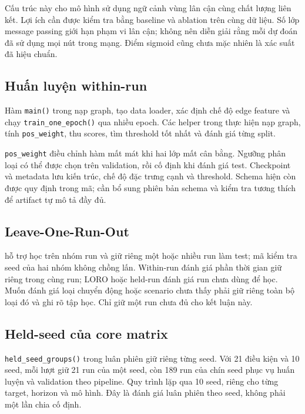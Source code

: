 \documentclass[12pt,a4paper]{article}
\newcommand{\code}[1]{{\small\texttt{#1}}}
\begin{document}
Cấu trúc này cho mô hình sử dụng ngữ cảnh vùng lân cận cùng chất lượng liên kết. Lợi ích cần được kiểm tra bằng baseline và ablation trên cùng dữ liệu. Số lớp message passing giới hạn phạm vi lân cận; không nên diễn giải rằng mỗi dự đoán đã sử dụng mọi nút trong mạng. Điểm sigmoid cũng chưa mặc nhiên là xác suất đã hiệu chuẩn.

\subsection{Huấn luyện within-run}

Hàm \code{main()} trong  nạp graph, tạo data loader, xác định chế độ edge feature và chạy \code{train\_one\_epoch()} qua nhiều epoch. Các helper trong  thực hiện nạp graph, tính \code{pos\_weight}, thu scores, tìm threshold tốt nhất và đánh giá từng split.

\code{pos\_weight} điều chỉnh hàm mất mát khi hai lớp mất cân bằng. Ngưỡng phân loại có thể được chọn trên validation, rồi cố định khi đánh giá test. Checkpoint và metadata lưu kiến trúc, chế độ đặc trưng cạnh và threshold. Schema hiện còn được quy định trong mã; cần bổ sung phiên bản schema và kiểm tra tương thích để artifact tự mô tả đầy đủ.

\subsection{Leave-One-Run-Out}

 hỗ trợ học trên nhóm run và giữ riêng một hoặc nhiều run làm test; mã kiểm tra seed của hai nhóm không chồng lấn. Within-run đánh giá phần thời gian giữ riêng trong cùng run; LORO hoặc held-run đánh giá run chưa dùng để học. Muốn đánh giá loại chuyển động hoặc scenario chưa thấy phải giữ riêng toàn bộ loại đó và ghi rõ tập học. Chỉ giữ một run chưa đủ cho kết luận này.

\subsection{Held-seed của core matrix}

\code{held\_seed\_groups()} trong  luân phiên giữ riêng từng seed. Với 21 điều kiện và 10 seed, mỗi lượt giữ 21 run của một seed, còn 189 run của chín seed phục vụ huấn luyện và validation theo pipeline. Quy trình lặp qua 10 seed, riêng cho từng target, horizon và mô hình. Đây là đánh giá luân phiên theo seed, không phải một lần chia cố định.
\end{document}
